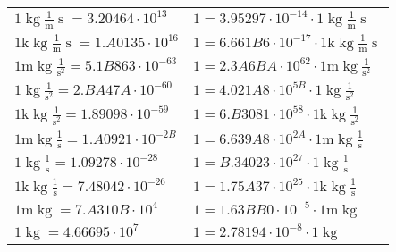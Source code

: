\begin{center}
\begin{longtable}{l l}
{\color{black}$1 \bm{\mathrm{ }}\operatorname{kg}\frac1{\operatorname{m}}{\operatorname{s}}{}{} = 3.20464\cdot10^{13} $}   & {\color{black}$ 1 = 3.95297\cdot10^{-14} \cdot 1 \bm{\mathrm{ }}\operatorname{kg}\frac1{\operatorname{m}}{\operatorname{s}}{}{}$}  \\
{\color{gray}$1 \bm{\mathrm{ k}}\operatorname{kg}\frac1{\operatorname{m}}{\operatorname{s}}{}{} = 1.A0135\cdot10^{16} $}   & {\color{gray}$ 1 = 6.661B6\cdot10^{-17} \cdot 1 \bm{\mathrm{ k}}\operatorname{kg}\frac1{\operatorname{m}}{\operatorname{s}}{}{}$}  \\
{\color{gray}$1 \bm{\mathrm{ m}}\operatorname{kg}{}\frac1{\operatorname{s}^2}{}{} = 5.1B863\cdot10^{-63} $}   & {\color{gray}$ 1 = 2.3A6BA\cdot10^{62} \cdot 1 \bm{\mathrm{ m}}\operatorname{kg}{}\frac1{\operatorname{s}^2}{}{}$}  \\
{\color{black}$1 \bm{\mathrm{ }}\operatorname{kg}{}\frac1{\operatorname{s}^2}{}{} = 2.BA47A\cdot10^{-60} $}   & {\color{black}$ 1 = 4.021A8\cdot10^{5B} \cdot 1 \bm{\mathrm{ }}\operatorname{kg}{}\frac1{\operatorname{s}^2}{}{}$}  \\
{\color{gray}$1 \bm{\mathrm{ k}}\operatorname{kg}{}\frac1{\operatorname{s}^2}{}{} = 1.89098\cdot10^{-59} $}   & {\color{gray}$ 1 = 6.B3081\cdot10^{58} \cdot 1 \bm{\mathrm{ k}}\operatorname{kg}{}\frac1{\operatorname{s}^2}{}{}$}  \\
{\color{gray}$1 \bm{\mathrm{ m}}\operatorname{kg}{}\frac1{\operatorname{s}}{}{} = 1.A0921\cdot10^{-2B} $}   & {\color{gray}$ 1 = 6.639A8\cdot10^{2A} \cdot 1 \bm{\mathrm{ m}}\operatorname{kg}{}\frac1{\operatorname{s}}{}{}$}  \\
{\color{black}$1 \bm{\mathrm{ }}\operatorname{kg}{}\frac1{\operatorname{s}}{}{} = 1.09278\cdot10^{-28} $}   & {\color{black}$ 1 = B.34023\cdot10^{27} \cdot 1 \bm{\mathrm{ }}\operatorname{kg}{}\frac1{\operatorname{s}}{}{}$}  \\
{\color{gray}$1 \bm{\mathrm{ k}}\operatorname{kg}{}\frac1{\operatorname{s}}{}{} = 7.48042\cdot10^{-26} $}   & {\color{gray}$ 1 = 1.75A37\cdot10^{25} \cdot 1 \bm{\mathrm{ k}}\operatorname{kg}{}\frac1{\operatorname{s}}{}{}$}  \\
{\color{gray}$1 \bm{\mathrm{ m}}\operatorname{kg}{}{}{}{} = 7.A310B\cdot10^{4} $}   & {\color{gray}$ 1 = 1.63BB0\cdot10^{-5} \cdot 1 \bm{\mathrm{ m}}\operatorname{kg}{}{}{}{}$}  \\
{\color{black}$1 \bm{\mathrm{ }}\operatorname{kg}{}{}{}{} = 4.66695\cdot10^{7} $}   & {\color{black}$ 1 = 2.78194\cdot10^{-8} \cdot 1 \bm{\mathrm{ }}\operatorname{kg}{}{}{}{}$}  \\

\end{longtable}
\end{center}
